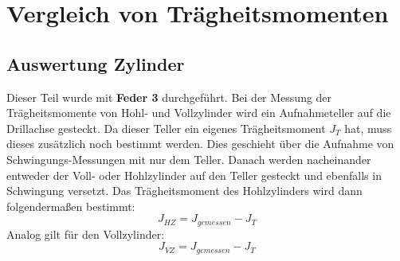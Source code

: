 \documentclass[12pt,a4paper]{article}
\begin{document}
\section{Vergleich von Trägheitsmomenten}

\subsection{Auswertung Zylinder}
Dieser Teil wurde mit \textbf{Feder 3} durchgeführt.
Bei der Messung der Trägheitsmomente von Hohl- und Vollzylinder wird ein Aufnahmeteller auf die Drillachse gesteckt. Da dieser Teller ein eigenes Trägheitsmoment $J_T$ hat, muss dieses zusätzlich noch bestimmt werden. Dies geschieht über die Aufnahme von Schwingungs-Messungen mit nur dem Teller. Danach werden nacheinander entweder der Voll- oder Hohlzylinder auf den Teller gesteckt und ebenfalls in Schwingung versetzt. Das Trägheitsmoment des Hohlzylinders wird dann folgendermaßen bestimmt:
\begin{equation}
J_{HZ} = J_{gemessen}-J_T
\end{equation}
Analog gilt für den Vollzylinder:
\begin{equation}
J_{VZ} = J_{gemessen}-J_T
\end{equation}
\end{document}
